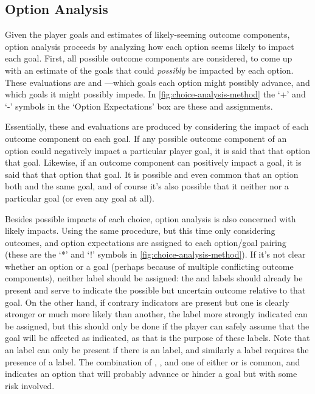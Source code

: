 \subsection{Option Analysis}

\label{sec:cp-option-analysis}

Given the player goals and estimates of likely-seeming outcome components, option analysis proceeds by analyzing how each option seems likely to impact each goal.
%
First, all possible outcome components are considered, to come up with an estimate of the goals that could \emph{possibly} be impacted by each option.
%
These evaluations are  and ---which goals each option might possibly advance, and which goals it might possibly impede.
%
In \cref{fig:choice-analysis-method} the `+' and `-' symbols in the `Option Expectations' box are these  and  assignments.


Essentially, these  and  evaluations are produced by considering the impact of each outcome component on each goal.
%
If any possible outcome component of an option could negatively impact a particular player goal, it is said that that option  that goal.
%
Likewise, if an outcome component can positively impact a goal, it is said that that option  that goal.
%
It is possible and even common that an option both  and  the same goal, and of course it's also possible that it neither  nor  a particular goal (or even any goal at all).


Besides possible impacts of each choice, option analysis is also concerned with likely impacts.
%
Using the same procedure, but this time only considering  outcomes,  and  option expectations are assigned to each option/goal pairing (these are the `*' and `!' symbols in \cref{fig:choice-analysis-method}).
%
If it's not clear whether an option  or  a goal (perhaps because of multiple conflicting outcome components), neither label should be assigned: the  and  labels should already be present and serve to indicate the possible but uncertain outcome relative to that goal.
%
On the other hand, if contrary indicators are present but one is clearly stronger or much more likely than another, the label more strongly indicated can be assigned, but this should only be done if the player can safely assume that the goal will be affected as indicated, as that is the purpose of these labels.
%
Note that an  label can only be present if there is an  label, and similarly a  label requires the presence of a  label.
%
The combination of , , and one of either  or  is common, and indicates an option that will probably advance or hinder a goal but with some risk involved.


